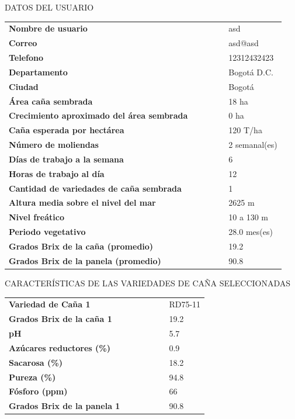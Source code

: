 \documentclass{article}%
\begin{document}
\newpage%
\begin{center}%
\begin{Huge}%
DATOS DEL USUARIO%
\end{Huge}%
\linebreak%
\end{center}%
\begin{tabular}{lccccl}%
\textbf{Nombre de usuario}& & & & &asd\\%
\textbf{Correo}& & & & &asd@asd\\%
\textbf{Telefono}& & & & &12312432423\\%
\textbf{Departamento}& & & & &Bogotá D.C.\\%
\textbf{Ciudad}& & & & &Bogotá\\%
\textbf{Área caña sembrada}& & & & &18 ha\\%
\textbf{Crecimiento aproximado del área sembrada}& & & & &0 ha\\%
\textbf{Caña esperada por hectárea}& & & & &120 T/ha\\%
\textbf{Número de moliendas}& & & & &2 semanal(es)\\%
\textbf{Días de trabajo a la semana}& & & & &6\\%
\textbf{Horas de trabajo al día}& & & & &12\\%
\textbf{Cantidad de variedades de caña sembrada}& & & & &1\\%
\textbf{Altura media sobre el nivel del mar}& & & & &2625 m\\%
\textbf{Nivel freático}& & & & &10 a 130 m\\%
\textbf{Periodo vegetativo}& & & & &28.0 mes(es)\\%
\textbf{Grados Brix de la caña (promedio)}& & & & &19.2\\%
\textbf{Grados Brix de la panela (promedio)}& & & & &90.8\\%
\end{tabular}%
\newpage%
\begin{center}%
\begin{Huge}%
CARACTERÍSTICAS DE LAS VARIEDADES DE CAÑA SELECCIONADAS%
\end{Huge}%
\linebreak%
\end{center}%
\begin{tabular}{lcccccl}%
\textbf{Variedad de Caña 1}& & & & & &RD75{-}11\\%
\textbf{Grados Brix de la caña 1}& & & & & &19.2\\%
\textbf{pH}& & & & & &5.7\\%
\textbf{Azúcares reductores (\%)}& & & & & &0.9\\%
\textbf{Sacarosa (\%)}& & & & & &18.2\\%
\textbf{Pureza (\%)}& & & & & &94.8\\%
\textbf{Fósforo (ppm)}& & & & & &66\\%
\textbf{Grados Brix de la panela 1}& & & & & &90.8\\%
\end{tabular}%
\linebreak%
\newline%
%
\linebreak%
\end{document}

